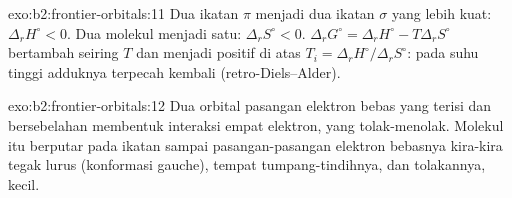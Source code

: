 \begin{solution}{exo:b2:frontier-orbitals:11}
Dua ikatan $\pi$ menjadi dua ikatan $\sigma$ yang lebih kuat: $\Delta_r H^\circ < 0$. Dua molekul menjadi satu:
$\Delta_r S^\circ < 0$. $\Delta_r G^\circ = \Delta_r H^\circ - T\Delta_r S^\circ$ bertambah seiring $T$ dan menjadi
positif di atas $T_i = \Delta_r H^\circ/\Delta_r S^\circ$: pada suhu tinggi adduknya terpecah kembali
(retro-Diels--Alder).
\end{solution}

\begin{solution}{exo:b2:frontier-orbitals:12}
Dua orbital pasangan elektron bebas yang terisi dan bersebelahan membentuk
interaksi empat elektron, yang tolak-menolak. Molekul itu berputar pada
ikatan  sampai pasangan-pasangan elektron bebasnya kira-kira tegak
lurus (konformasi gauche), tempat tumpang-tindihnya, dan tolakannya, kecil.
\end{solution}

